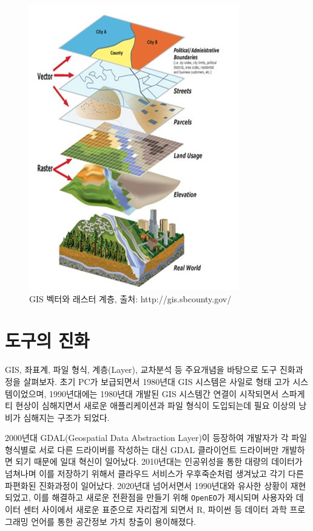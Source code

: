 \documentclass[
  a4paper,showtrims,openright,hidelinks]{oblivoir}
\begin{document}
\begin{figure}

{\centering \includegraphics{images/gis_layers.jpg}

}

\caption{\label{fig-layers}GIS 벡터와 래스터 계층, 출처:
http://gis.sbcounty.gov/}

\end{figure}

\hypertarget{uxb3c4uxad6cuxc758-uxc9c4uxd654}{%
\section{도구의 진화}\label{uxb3c4uxad6cuxc758-uxc9c4uxd654}}

GIS, 좌표계, 파일 형식, 계층(Layer), 교차분석 등 주요개념을 바탕으로
도구 진화과정을 살펴보자. 초기 PC가 보급되면서 1980년대 GIS 시스템은
사일로 형태 고가 시스템이었으며, 1990년대에는 1980년대 개발된 GIS
시스템간 연결이 시작되면서 스파게티 현상이 심해지면서 새로운
애플리케이션과 파일 형식이 도입되는데 필요 이상의 낭비가 심해지는 구조가
되었다.

2000년대 GDAL(Geospatial Data Abstraction Layer)이 등장하여 개발자가 각
파일 형식별로 서로 다른 드라이버를 작성하는 대신 GDAL 클라이언트
드라이버만 개발하면 되기 때문에 일대 혁신이 일어났다. 2010년대는
인공위성을 통한 대량의 데이터가 넘쳐나며 이를 저장하기 위해서 클라우드
서비스가 우후죽순처럼 생겨났고 각기 다른 파편화된 진화과정이 일어났다.
2020년대 넘어서면서 1990년대와 유사한 상황이 재현되었고, 이를 해결하고
새로운 전환점을 만들기 위해 \texttt{OpenEO}가 제시되며 사용자와 데이터
센터 사이에서 새로운 표준으로 자리잡게 되면서 R, 파이썬 등 데이터 과학
프로그래밍 언어를 통한 공간정보 가치 창출이 용이해졌다.
\autocite{Pebesma2016}
\end{document}
